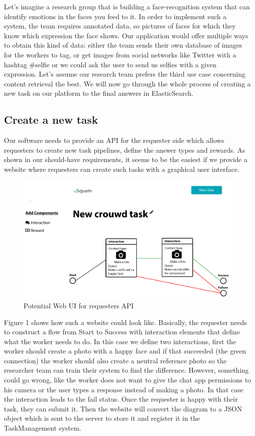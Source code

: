 \documentclass[a4paper,dutch,fleqn]{exam}
\begin{document}
Let's imagine a research group that is building a face-recognition system that can identify emotions in the faces you feed to it. In order to implement such a system, the team requires annotated data, so pictures of faces for which they know which expression the face shows. Our application would offer multiple ways to obtain this kind of data: either the team sends their own database of images for the workers to tag, or get images from social networks like Twitter with a hashtag \#selfie or we could ask the user to send us selfies with a given expression. Let's assume our research team prefers the third use case concerning content retrieval the best. We will now go through the whole process of creating a new task on our platform to the final answers in ElasticSearch. 

\subsection{Create a new task} 
Our software needs to provide an API for the requester side which allows requesters to create new task pipelines, define the answer types and rewards. As shown in our should-have requirements, it seems to be the easiest if we provide a website where requesters can create such tasks with a graphical user interface. 

\begin{figure}[!ht]
    \centering
    \includegraphics[scale=0.5]{image02}
    \caption{Potential Web UI for requesters API}
\end{figure}

Figure 1 shows how such a website could look like. Basically, the requester needs to construct a flow from Start to Success with interaction elements that define what the worker needs to do. In this case we define two interactions, first the worker should create a photo with a happy face and if that succeeded (the green connection) the worker should also create a neutral reference photo so the researcher team can train their system to find the difference. However, something could go wrong, like the worker does not want to give the chat app permissions to his camera or the user types a response instead of making a photo. In that case the interaction leads to the fail status. Once the requester is happy with their task, they can submit it. Then the website will convert the diagram to a JSON object which is sent to the server to store it and register it in the TaskManagement system.
\end{document}
